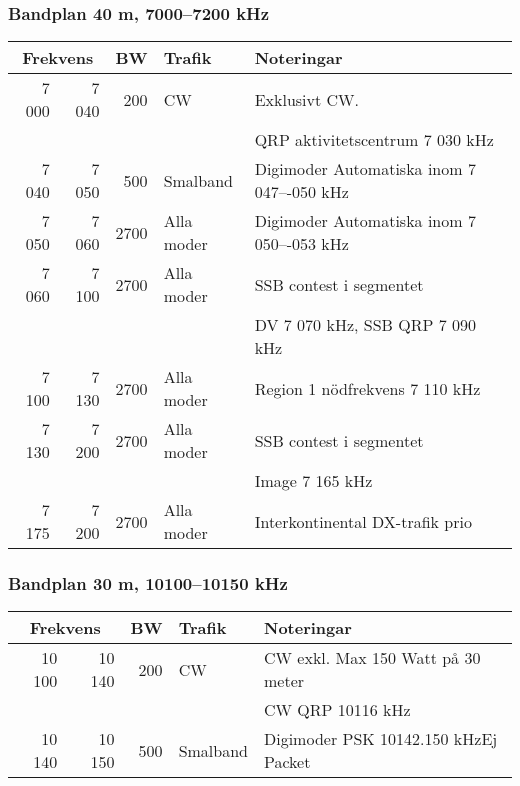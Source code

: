 \begin{landscape}
\subsubsection{Bandplan 40 m, 7000--7200 kHz}
\begin{tabular}{rrrll}
\multicolumn{2}{c}{\textbf{Frekvens}} & \textbf{BW} & \textbf{Trafik} & \textbf{Noteringar} \\ \hline
7 000 & 7 040 & 200  & CW         & Exklusivt CW.                             \\
      &       &      &            & QRP aktivitetscentrum 7 030 kHz           \\ \hline
7 040 & 7 050 & 500  & Smalband   & Digimoder Automatiska inom 7 047–-050 kHz \\ \hline
7 050 & 7 060 & 2700 & Alla moder & Digimoder Automatiska inom 7 050–-053 kHz \\ \hline
7 060 & 7 100 & 2700 & Alla moder & SSB contest i segmentet                   \\
      &       &      &            & DV 7 070 kHz, SSB QRP 7 090 kHz           \\ \hline
7 100 & 7 130 & 2700 & Alla moder & Region 1 nödfrekvens 7 110 kHz            \\ \hline
7 130 & 7 200 & 2700 & Alla moder & SSB contest i segmentet                   \\
      &       &      &            & Image 7 165 kHz                           \\ \hline
7 175 & 7 200 & 2700 & Alla moder & Interkontinental DX-trafik prio           \\ \hline
\end{tabular}

\subsubsection{Bandplan 30 m, 10100--10150 kHz}
\begin{tabular}{rrrll}
\multicolumn{2}{c}{\textbf{Frekvens}} & \textbf{BW} & \textbf{Trafik} & \textbf{Noteringar} \\ \hline
10 100 & 10 140 & 200 & CW       & CW exkl. Max 150 Watt på 30 meter    \\
       &        &     &          & CW QRP 10116 kHz                     \\ \hline
10 140 & 10 150 & 500 & Smalband & Digimoder PSK 10142.150 kHzEj Packet \\ \hline
\end{tabular}


\end{landscape}
